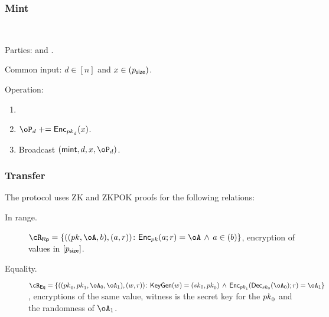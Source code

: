 \subsubsection{Mint}

\begin{protocol}~\label{prot:ConfidentialTransactions:Mint}
	\item[Parties:] \Mc and \Cc.
	
	
	
	\item[Common input:]  $d\in [n]$ and $x\in (p_{\mathsf{size}})$.
	
	\item[Operation:]  \Cc~
		\begin{enumerate}
			\item {}
			
			\item  $\oP_d \pluseq \Enc_{\pk_d}(x)$.
				
			
			\item Broadcast 	 	$(\mint,d,x,\oP_d)$.
		
	\end{enumerate}
\end{protocol}

\subsubsection{Transfer}

The protocol uses ZK and ZKPOK proofs for the   following  relations:

\begin{description}
	\item[In range.] $\rRp =\rRpDef$, \ie  encryption of values in $[p_{\mathsf{size}}]$.
	
	\item[Equality.] $\rEq =\rEqDef$, \ie  encryptions of the same value, witness is the  secret key for the ${pk}_0$ and the randomness of  $\oA_1$.
	
\end{description}




